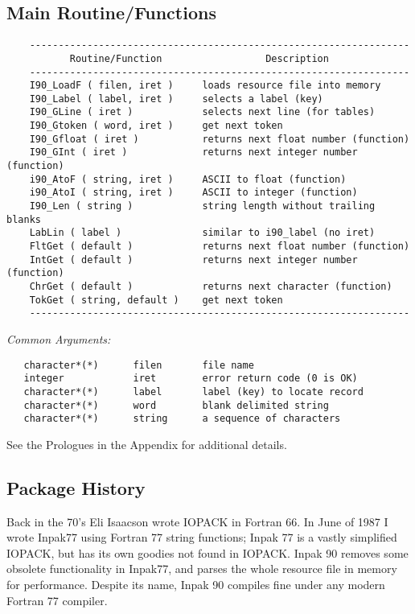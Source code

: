\subsection{Main Routine/Functions}
%  
   \begin{verbatim}
    ------------------------------------------------------------------
           Routine/Function                  Description
    ------------------------------------------------------------------
    I90_LoadF ( filen, iret )     loads resource file into memory
    I90_Label ( label, iret )     selects a label (key)
    I90_GLine ( iret )            selects next line (for tables)
    I90_Gtoken ( word, iret )     get next token 
    I90_Gfloat ( iret )           returns next float number (function)
    I90_GInt ( iret )             returns next integer number (function)
    i90_AtoF ( string, iret )     ASCII to float (function)
    i90_AtoI ( string, iret )     ASCII to integer (function)
    I90_Len ( string )            string length without trailing blanks
    LabLin ( label )              similar to i90_label (no iret)
    FltGet ( default )            returns next float number (function)
    IntGet ( default )            returns next integer number (function)
    ChrGet ( default )            returns next character (function)
    TokGet ( string, default )    get next token
    ------------------------------------------------------------------
   \end{verbatim}
%  
   {\em Common Arguments:}
%  
   \begin{verbatim}
   character*(*)      filen       file name
   integer            iret        error return code (0 is OK)
   character*(*)      label       label (key) to locate record
   character*(*)      word        blank delimited string
   character*(*)      string      a sequence of characters
   \end{verbatim}
   See the Prologues in the Appendix for additional details.
\subsection{Package History} 
         Back in the 70's Eli Isaacson wrote IOPACK in Fortran
         66.  In June of 1987 I wrote Inpak77 using
         Fortran 77 string functions; Inpak 77 is a vastly
         simplified IOPACK, but has its own goodies not found in
         IOPACK.  Inpak 90 removes some obsolete functionality in
         Inpak77, and parses the whole resource file in memory for
         performance.  Despite its name, Inpak 90 compiles fine
         under any modern Fortran 77 compiler.
